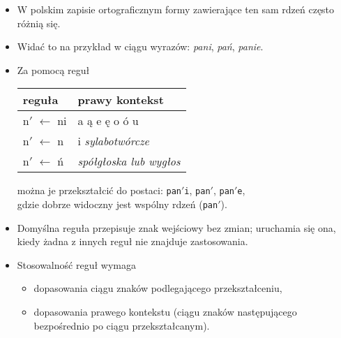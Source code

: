 \documentclass{beamer}
\begin{document}
\begin{frame}
\frametitle{}
\begin{itemize}
\item W polskim zapisie ortograficznym formy zawierające ten sam rdzeń często różnią się.
\item Widać to na przykład w ciągu wyrazów: \textit{pani}, \textit{pań}, \textit{panie}.
\item Za pomocą reguł 
\begin{center}
\begin{tabular}{l|l}
reguła & prawy kontekst \\
\hline
n$'$ $\leftarrow$ ni & a ą e ę o ó u\\
n$'$ $\leftarrow$ n & i {\it sylabotwórcze}\\
n$'$ $\leftarrow$ ń & {\it spółgłoska lub wygłos}\\
\end{tabular}
\end{center}

można je przekształcić do postaci: \texttt{pan$'$i}, \texttt{pan$'$}, \texttt{pan$'$e},\\
gdzie dobrze widoczny jest wspólny rdzeń (\texttt{pan$'$}).
\item Domyślna reguła przepisuje znak wejściowy bez zmian; uruchamia się ona, kiedy żadna z innych reguł nie znajduje zastosowania.
\item Stosowalność reguł wymaga
\begin{itemize}
\item dopasowania ciągu znaków podlegającego przekształceniu, 
\item dopasowania prawego kontekstu (ciągu znaków następującego bezpośrednio po ciągu przekształcanym).
\end{itemize}
\end{itemize}
\end{frame}
\end{document}
